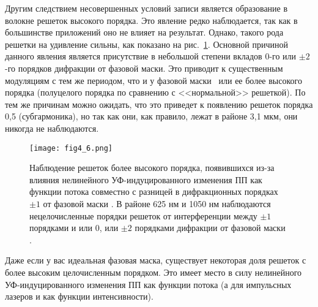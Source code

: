 Другим следствием несовершенных условий записи является образование в волокне решеток высокого порядка. Это явление редко наблюдается, так как в большинстве приложений оно не влияет на результат. Однако, такого рода решетки на удивление сильны, как показано на рис.~\ref{fig4.6}. Основной причиной данного явления является присутствие в небольшой степени вкладов 0-го или $\pm 2$-го порядков дифракции от фазовой маски. Это приводит к существенным модуляциям с тем же периодом, что и у фазовой маски~\cite{HubnerPhD98, Malo93} или ее более высокого порядка (полуцелого порядка по сравнению с <<нормальной>> решеткой). По тем же причинам можно ожидать, что это приведет к появлению решеток порядка 0,5 (субгармоника), но так как они, как правило, лежат в районе 3,1 мкм, они никогда не наблюдаются.
\begin{figure}
\centering
\texttt{[image: fig4\_6.png]}
\caption{Наблюдение решеток более высокого порядка, появившихся из-за влияния нелинейного УФ-индуцированного изменения ПП как функции потока совместно с разницей в дифракционных порядках $\pm 1$ от фазовой маски \cite{HubnerPhD98}. В районе 625 нм и 1050 нм наблюдаются нецелочисленные порядки решеток от интерференции между $\pm 1$ порядками и или $0$, или $\pm 2$ порядками дифракции от фазовой маски \cite{Dyer95}.}\label{fig4.6}
\end{figure}
Даже если у вас идеальная фазовая маска, существует некоторая доля решеток с более высоким целочисленным порядком. Это имеет место в силу нелинейного УФ-индуцированного изменения ПП как функции потока (а для импульсных лазеров и как функции интенсивности).


